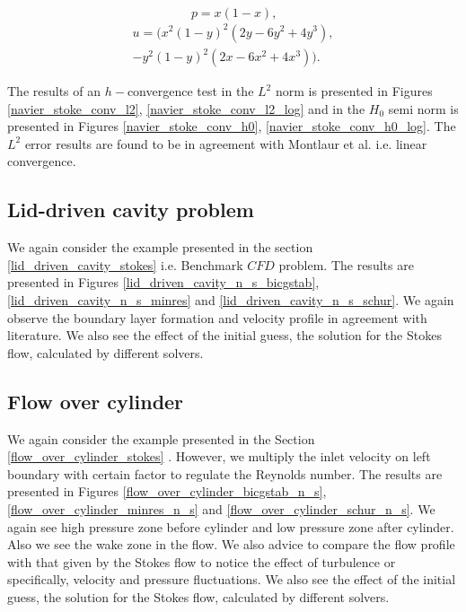 \documentclass[a4paper,twoside,openright]{book}
\begin{document}
\begin{center}
\begin{equation}
p = x(1 - x) \textrm{,}
\end{equation}
\begin{equation} 
\begin{split}
u = (x^2(1-y)^2(2y-6y^2+4y^3),\\-y^2(1-y)^2(2x-6x^2+4x^3)) \textrm{.}
\end{split}
\end{equation}
\end{center}

The results of an $h-$convergence test in the $L^2$ norm is presented in Figures \ref{navier_stoke_conv_l2}, \ref{navier_stoke_conv_l2_log} and in the $H_0$ semi norm is presented in Figures \ref{navier_stoke_conv_h0}, \ref{navier_stoke_conv_h0_log}. The $L^2$ error results are found to be in agreement with Montlaur et al. \cite{Montlaur} i.e. linear convergence.\\

\subsection{Lid-driven cavity problem} \label{lid_driven_cavity_navier_stokes}

We again consider the example presented in the section \ref{lid_driven_cavity_stokes} i.e. Benchmark $CFD$ problem. The results are presented in Figures \ref{lid_driven_cavity_n_s_bicgstab}, \ref{lid_driven_cavity_n_s_minres} and \ref{lid_driven_cavity_n_s_schur}. We again observe the boundary layer formation and velocity profile in agreement with literature. We also see the effect of the initial guess, the solution for the Stokes flow, calculated by different solvers. 

\subsection{Flow over cylinder} \label{flow_over_cylinder_navier_stokes}

We again consider the example presented in the Section \ref{flow_over_cylinder_stokes} . However, we multiply the inlet velocity on left boundary with certain factor to regulate the Reynolds number. The results are presented in Figures \ref{flow_over_cylinder_bicgstab_n_s}, \ref{flow_over_cylinder_minres_n_s} and \ref{flow_over_cylinder_schur_n_s}. We again see high pressure zone before cylinder and low pressure zone after cylinder. Also we see the wake zone in the flow. We also advice to compare the flow profile with that given by the Stokes flow to notice the effect of turbulence or specifically, velocity and pressure fluctuations. We also see the effect of the initial guess, the solution for the Stokes flow, calculated by different solvers. 
\end{document}
